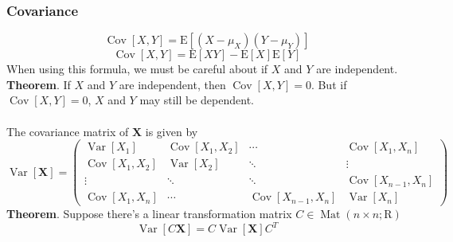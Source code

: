 \documentclass[a4paper,12pt]{article}
\begin{document}
    \subsubsection{Covariance}
    \begin{equation}
        \operatorname{Cov}[X, Y]=\mathrm{E}\left[\left(X-\mu_X\right)\left(Y-\mu_Y\right)\right]
        \end{equation}
    \begin{equation}
        \operatorname{Cov}[X, Y]=\mathrm{E}[X Y]-\mathrm{E}[X] \mathrm{E}[Y]
        \end{equation}
    When using this formula, we must be careful about if $X$ and $Y$ are independent.\\
    \textbf{Theorem}. If $X$ and $Y$ are independent, then $\operatorname{Cov}[X, Y]=0$. But if $\operatorname{Cov}[X, Y]=0$, $X$ and $Y$ may still be dependent.\\
    ~\\
    \noindent The covariance matrix of $\boldsymbol{X}$ is given by
    \begin{equation}
        \operatorname{Var}[\mathbf{X}]=\left(\begin{array}{cccc}
        \operatorname{Var}\left[X_1\right] & \operatorname{Cov}\left[X_1, X_2\right] & \cdots & \operatorname{Cov}\left[X_1, X_n\right] \\
        \operatorname{Cov}\left[X_1, X_2\right] & \operatorname{Var}\left[X_2\right] & \ddots & \vdots \\
        \vdots & \ddots & \ddots & \operatorname{Cov}\left[X_{n-1}, X_n\right] \\
        \operatorname{Cov}\left[X_1, X_n\right] & \cdots & \operatorname{Cov}\left[X_{n-1}, X_n\right] & \operatorname{Var}\left[X_n\right]
        \end{array}\right)
        \end{equation}
    \textbf{Theorem}. Suppose there's a linear transformation matrix $C \in \operatorname{Mat}(n \times n ; \mathrm{R})$
    \begin{equation}
        \operatorname{Var}[C \boldsymbol{X}]=C \operatorname{Var}[\boldsymbol{X}] C^T
        \end{equation}
\end{document}
